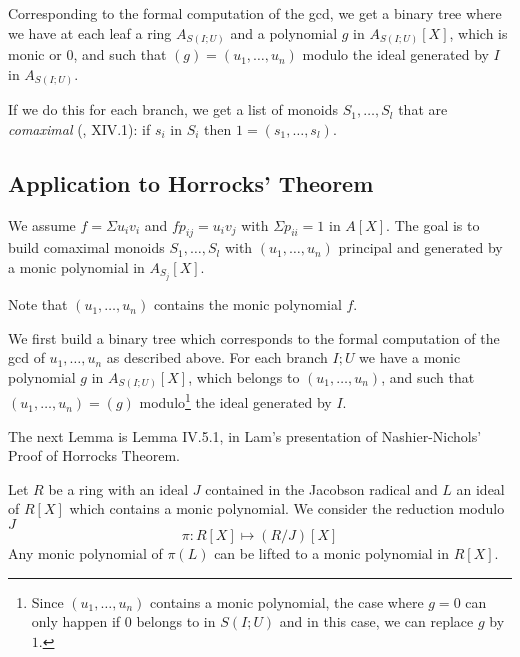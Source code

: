 Corresponding to the formal computation of the gcd, we get a binary tree where we have at each leaf
a ring $A_{S(I;U)}$ and a polynomial $g$ in $A_{S(I;U)}[X]$, which is monic or $0$, and
such that $(g) = (u_1,\dots,u_n)$ modulo the ideal generated by $I$ in $A_{S(I;U)}$.


If we do this for each branch, we get a list of monoids $S_1,\dots,S_l$
that are {\em comaximal} (\cite{lombardi-quitte}, XIV.1): if $s_i$ in $S_i$ then $1 = (s_1,\dots,s_l)$.

\subsection{Application to Horrocks' Theorem}

We assume $f = \Sigma u_iv_i$ and $fp_{ij} = u_iv_j$ with $\Sigma p_{ii} = 1$
in $A[X]$. The goal is to build comaximal monoids $S_1,\dots,S_l$ with $(u_1,\dots,u_n)$ principal
and generated by a monic polynomial in $A_{S_j}[X]$.

Note that $(u_1,\dots,u_n)$ contains the monic polynomial $f$.

We first build a binary tree which corresponds to the formal computation of the gcd of
$u_1,\dots,u_n$ as described above. For each branch $I;U$ we have a monic polynomial
$g$ in $A_{S(I;U)}[X]$, which belongs to $(u_1,\dots,u_n)$, and
such that $(u_1,\dots,u_n) = (g)$ modulo\footnote{Since $(u_1,\dots,u_n)$
contains a monic polynomial, the case where $g=0$ can only happen if $0$ belongs to in $S(I;U)$ and in this
case, we can replace $g$ by $1$.} the ideal generated by $I$.

The next Lemma is Lemma IV.5.1, \cite{Lam} in Lam's presentation of
Nashier-Nichols' Proof of Horrocks Theorem.

\begin{lemma}
  Let $R$ be a ring with an ideal $J$ contained in the Jacobson radical
  and $L$ an ideal of $R[X]$ which contains a monic polynomial. We consider
  the reduction modulo $J$
  $$\pi: R[X]\mapsto (R/J)[X]$$
  Any monic polynomial of $\pi(L)$ can be lifted to a monic polynomial in $R[X]$.
\end{lemma}

